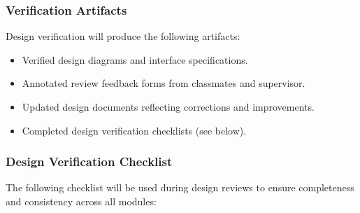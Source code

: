\documentclass[12pt, titlepage]{article}
\begin{document}
\subsubsection*{Verification Artifacts}
Design verification will produce the following artifacts:
\begin{itemize}
  \item Verified design diagrams and interface specifications.
  \item Annotated review feedback forms from classmates and supervisor.
  \item Updated design documents reflecting corrections and improvements.
  \item Completed design verification checklists (see below).
\end{itemize}

\subsubsection*{Design Verification Checklist}
The following checklist will be used during design reviews to ensure
completeness and consistency across all modules:

\newpage
\end{document}
